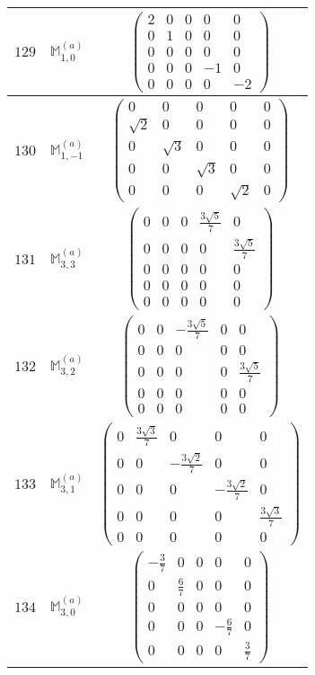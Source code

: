 \documentclass[fleqn,8pt,landscape]{jsarticle}
\begin{document}
\begin{center}
\begin{longtable}{ccc}
$ 129 $ & $ \mathbb{M}_{1,0}^{(a)} $ & $ \begin{pmatrix} 2 & 0 & 0 & 0 & 0 \\ 0 & 1 & 0 & 0 & 0 \\ 0 & 0 & 0 & 0 & 0 \\ 0 & 0 & 0 & -1 & 0 \\ 0 & 0 & 0 & 0 & -2 \end{pmatrix} $ \\ \hline
$ 130 $ & $ \mathbb{M}_{1,-1}^{(a)} $ & $ \begin{pmatrix} 0 & 0 & 0 & 0 & 0 \\ \sqrt{2} & 0 & 0 & 0 & 0 \\ 0 & \sqrt{3} & 0 & 0 & 0 \\ 0 & 0 & \sqrt{3} & 0 & 0 \\ 0 & 0 & 0 & \sqrt{2} & 0 \end{pmatrix} $ \\ \hline
$ 131 $ & $ \mathbb{M}_{3,3}^{(a)} $ & $ \begin{pmatrix} 0 & 0 & 0 & \frac{3 \sqrt{5}}{7} & 0 \\ 0 & 0 & 0 & 0 & \frac{3 \sqrt{5}}{7} \\ 0 & 0 & 0 & 0 & 0 \\ 0 & 0 & 0 & 0 & 0 \\ 0 & 0 & 0 & 0 & 0 \end{pmatrix} $ \\ \hline
$ 132 $ & $ \mathbb{M}_{3,2}^{(a)} $ & $ \begin{pmatrix} 0 & 0 & - \frac{3 \sqrt{5}}{7} & 0 & 0 \\ 0 & 0 & 0 & 0 & 0 \\ 0 & 0 & 0 & 0 & \frac{3 \sqrt{5}}{7} \\ 0 & 0 & 0 & 0 & 0 \\ 0 & 0 & 0 & 0 & 0 \end{pmatrix} $ \\ \hline
$ 133 $ & $ \mathbb{M}_{3,1}^{(a)} $ & $ \begin{pmatrix} 0 & \frac{3 \sqrt{3}}{7} & 0 & 0 & 0 \\ 0 & 0 & - \frac{3 \sqrt{2}}{7} & 0 & 0 \\ 0 & 0 & 0 & - \frac{3 \sqrt{2}}{7} & 0 \\ 0 & 0 & 0 & 0 & \frac{3 \sqrt{3}}{7} \\ 0 & 0 & 0 & 0 & 0 \end{pmatrix} $ \\ \hline
$ 134 $ & $ \mathbb{M}_{3,0}^{(a)} $ & $ \begin{pmatrix} - \frac{3}{7} & 0 & 0 & 0 & 0 \\ 0 & \frac{6}{7} & 0 & 0 & 0 \\ 0 & 0 & 0 & 0 & 0 \\ 0 & 0 & 0 & - \frac{6}{7} & 0 \\ 0 & 0 & 0 & 0 & \frac{3}{7} \end{pmatrix} $ \\ \hline

\end{longtable}
\end{center}
\end{document}
